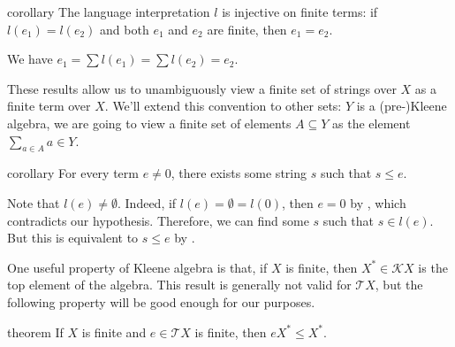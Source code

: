 \documentclass[a4paper,UKenglish,cleveref, autoref, thm-restate]{lipics-v2021}
\begin{document}
\begin{theoremEnd}{corollary}
  \label{thm:finiteness-injective}
  The language interpretation $l$ is injective on finite terms: if $l(e_{1}) =
  l(e_{2})$ and both \(e_1\) and \(e_2\) are finite, then $e_{1} = e_{2}$.
\end{theoremEnd}

\begin{proofEnd}
  We have $e_{1} =  \sum l(e_{1}) =  \sum l(e_{2}) = e_{2}$.
\end{proofEnd}

These results allow us to unambiguously view a finite set of strings over $X$ as
a finite term over $X$.  We'll extend this convention to other sets: $Y$ is a
(pre-)Kleene algebra, we are going to view a finite set of elements $A  \subseteq  Y$ as
the element $ \sum _{a  \in  A} a  \in  Y$.

\begin{theoremEnd}{corollary}
  \label{thm:emptiness-characterization}
  For every term $e  \neq  0$, there exists some string $s$ such that $s  \leq  e$.
\end{theoremEnd}

\begin{proofEnd}
  Note that $l(e)  \neq   \emptyset $.  Indeed, if $l(e) =  \emptyset  = l(0)$, then $e = 0$ by
  , which contradicts our hypothesis.  Therefore,
  we can find some $s$ such that $s  \in  l(e)$.  But this is equivalent to $s  \leq  e$
  by .
\end{proofEnd}

One useful property of Kleene algebra is that, if $X$ is finite, then
$X^*  \in  \mathcal{K}X$ is the top element of the algebra.  This result is
generally not valid for $\mathcal{T}X$, but the following property will be good
enough for our purposes.

\begin{theoremEnd}[normal]{theorem}
  If $X$ is finite and $e  \in  \mathcal{T}X$ is finite, then $eX^*  \leq  X^*$.
\end{theoremEnd}
\end{document}

